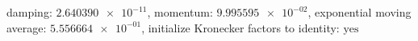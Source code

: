 damping: $\num[scientific-notation=true]{2.640390e-11}$, momentum: $\num[scientific-notation=true]{9.995595e-02}$, exponential moving average: $\num[scientific-notation=true]{5.556664e-01}$, initialize Kronecker factors to identity: $\text{yes}$